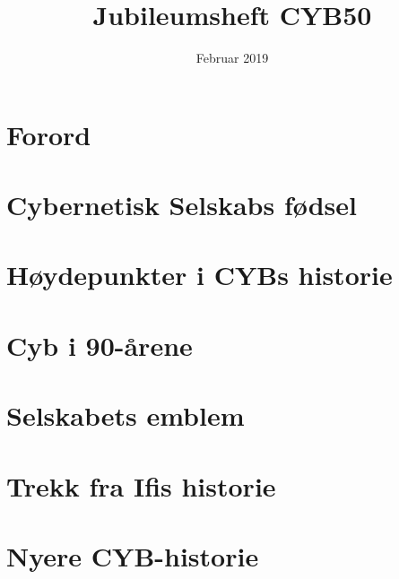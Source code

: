 \documentclass{article} %
\title{Jubileumsheft CYB50}
\author{}
\date{Februar 2019}
\begin{document}
\maketitle
\tableofcontents

\section{Forord}


\section{Cybernetisk Selskabs fødsel}


\section{Høydepunkter i CYBs historie}


\section{Cyb i 90-årene}


\section{Selskabets emblem}


\section{Trekk fra Ifis historie} %


\section{Nyere CYB-historie} %


\end{document}
